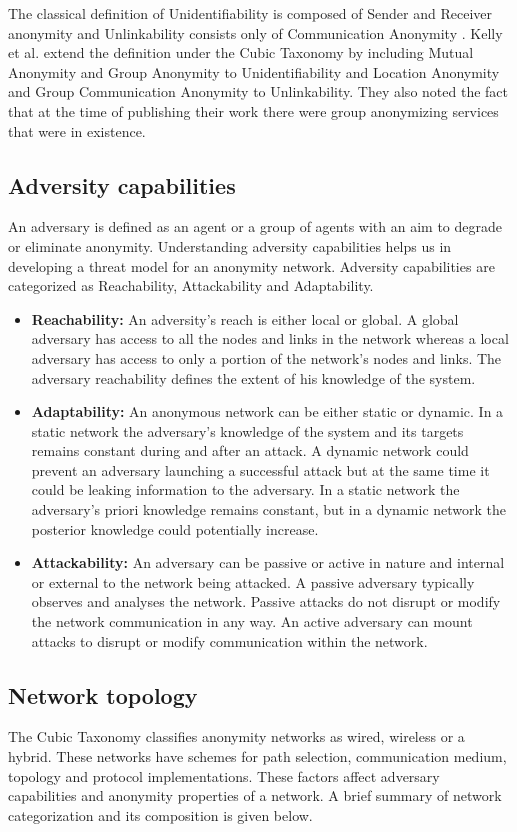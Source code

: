 \documentclass{llncs}
\begin{document}
The classical definition of Unidentifiability is composed of Sender and Receiver anonymity and Unlinkability consists only of Communication Anonymity \cite{terminology}. Kelly et al. \cite{kelly2012exploring} extend the definition under the Cubic Taxonomy by including Mutual Anonymity and Group Anonymity to Unidentifiability and Location Anonymity and Group Communication Anonymity to Unlinkability. They also noted the fact that at the time of publishing their work there were group anonymizing services that were in existence.

\subsection{Adversity capabilities}
An adversary is defined as an agent or a group of agents with an aim to degrade or eliminate anonymity. Understanding adversity capabilities helps us in developing a threat model for an anonymity network. Adversity capabilities are categorized as Reachability, Attackability and Adaptability.

\begin{itemize}
	\item[]{\textbf{Reachability:} An adversity's reach is either local or global. A global adversary has access to all the nodes and links in the network whereas a local adversary has access to only a portion of the network's nodes and links. The adversary reachability defines the extent of his knowledge of the system.}
	\item[]{\textbf{Adaptability:} An anonymous network can be either static or dynamic. In a static network the adversary's knowledge of the system and its targets remains constant during and after an attack. A dynamic network could prevent an adversary launching a successful attack but at the same time it could be leaking information to the adversary. In a static network the adversary's priori knowledge remains constant, but in a dynamic network the posterior knowledge could potentially increase.}
	\item[]{\textbf{Attackability:} An adversary can be passive or active in nature and internal or external to the network being attacked. A passive adversary typically observes and analyses the network. Passive attacks do not disrupt or modify the network communication in any way. An active adversary can mount attacks to disrupt or modify communication within the network.}
\end{itemize}

\subsection{ Network topology}
The Cubic Taxonomy \cite{kelly2012exploring} classifies anonymity networks as wired, wireless or a hybrid. These networks have schemes for  path selection, communication medium, topology and protocol implementations. These factors affect adversary capabilities and anonymity properties of a network. A brief summary of network categorization and its composition is given below.
\end{document}
